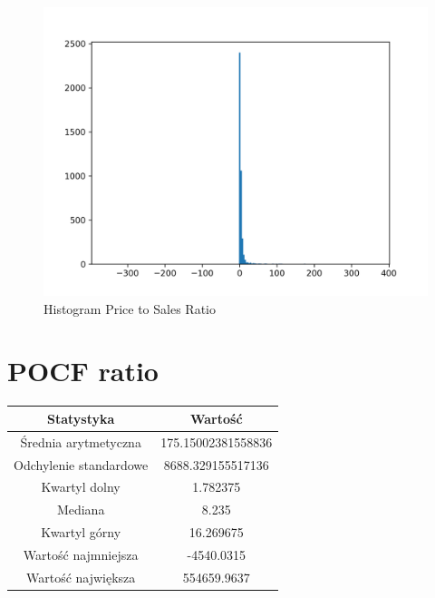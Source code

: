 \documentclass{article}
\begin{document}
\begin{figure}[h!]
    \includegraphics[width=\linewidth]{variables/Price to Sales Ratio.png}
    \caption{Histogram Price to Sales Ratio }
\end{figure}\section{ POCF ratio }

\begin{center}
    \begin{tabular}{|c | c|} 
    \hline
    Statystyka & Wartość \\
    \hline\hline
    Średnia arytmetyczna & 175.15002381558836 \\ 
    \hline
    Odchylenie standardowe & 8688.329155517136 \\
    \hline
    Kwartyl dolny & 1.782375 \\
    \hline
    Mediana & 8.235 \\
    \hline
    Kwartyl górny & 16.269675 \\
    \hline
    Wartość najmniejsza & -4540.0315 \\
    \hline
    Wartość największa & 554659.9637 \\
    \hline
   \end{tabular}
\end{center}
\end{document}
